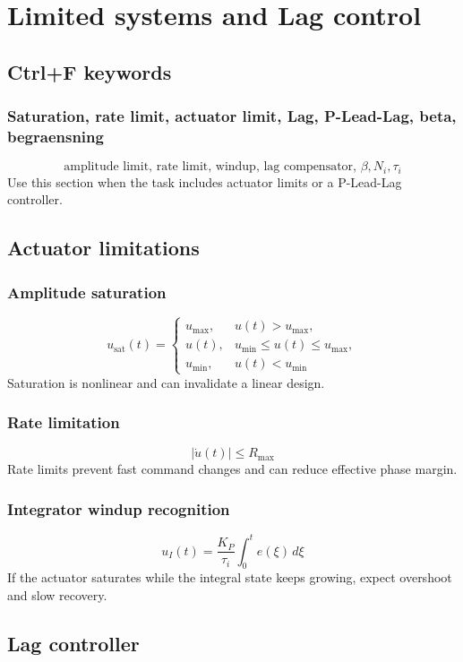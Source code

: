 \section{Limited systems and Lag control}

\subsection{Ctrl+F keywords}

\subsubsection{Saturation, rate limit, actuator limit, Lag, P-Lead-Lag, beta, begraensning}
\[
\text{amplitude limit, rate limit, windup, lag compensator, } \beta,N_i,\tau_i
\]
Use this section when the task includes actuator limits or a P-Lead-Lag controller.

\subsection{Actuator limitations}

\subsubsection{Amplitude saturation}
\[
u_{\mathrm{sat}}(t)=
\begin{cases}
u_{\max}, & u(t)>u_{\max},\\
u(t), & u_{\min}\leq u(t)\leq u_{\max},\\
u_{\min}, & u(t)<u_{\min}
\end{cases}
\]
Saturation is nonlinear and can invalidate a linear design.

\subsubsection{Rate limitation}
\[
|\dot{u}(t)|\leq R_{\max}
\]
Rate limits prevent fast command changes and can reduce effective phase margin.

\subsubsection{Integrator windup recognition}
\[
u_I(t)=\frac{K_P}{\tau_i}\int_0^t e(\xi)\,d\xi
\]
If the actuator saturates while the integral state keeps growing, expect overshoot and slow recovery.

\subsection{Lag controller}

